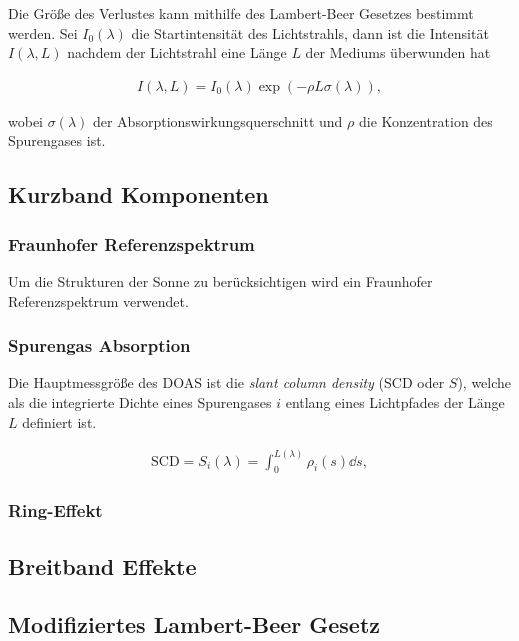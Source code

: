 \documentclass[12pt, a4paper, bibliography=totoc]{scrartcl}
\begin{document}
\begin{multicols}{2}
Die Größe des Verlustes kann mithilfe des Lambert-Beer Gesetzes bestimmt werden.
Sei $I_0 (\lambda)$ die Startintensität des Lichtstrahls, dann ist die Intensität $I(\lambda, L)$ nachdem der Lichtstrahl eine Länge $L$ der Mediums überwunden hat
    
\begin{align}
    I(\lambda, L) = I_0 (\lambda) \exp \left( - \rho L \sigma (\lambda)\right) ,\label{eq:lambert_beer_law}
\end{align}

wobei $\sigma (\lambda)$ der Absorptionswirkungsquerschnitt und $\rho$ die Konzentration des Spurengases ist.

\subsection{Kurzband Komponenten}\label{ssec:Kurzband}

\subsubsection{Fraunhofer Referenzspektrum}\label{sssec:fraunhofer_reference}

Um die Strukturen der Sonne zu berücksichtigen wird ein Fraunhofer Referenzspektrum verwendet.

\subsubsection{Spurengas Absorption}\label{sssec:trace_gas_absorption}

Die Hauptmessgröße des DOAS ist die \textit{slant column density} (SCD oder $S$),
welche als die integrierte Dichte eines Spurengases $i$ entlang eines Lichtpfades der Länge $L$ definiert ist.
    
\begin{align}
    \text{SCD} = S_i (\lambda) = \int_0^{L(\lambda)} \rho_i (s) \dd s ,\label{eq:SCD}
\end{align}

\subsubsection{Ring-Effekt}

\subsection{Breitband Effekte}

\subsection{Modifiziertes Lambert-Beer Gesetz}\label{ssec:mod_lamb-beer_law}


\end{multicols}
\end{document}
